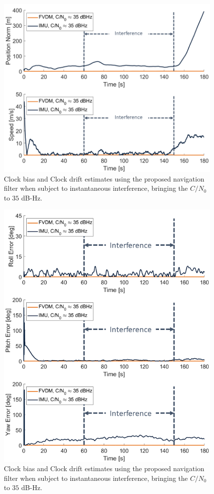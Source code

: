 \documentclass[12pt]{report}
\begin{document}
\begin{figure}[!ht]
  \centering
  \includegraphics[width=0.75\linewidth]{Figures/Results/trajectoryfigure/Slide18.PNG}
  \caption{Clock bias and Clock drift estimates using the proposed navigation filter when subject to instantaneous interference, bringing the \(C/N_0\) to \(35\) dB-Hz.}\label{fig:PosVel35}
\end{figure}


\begin{figure}[!ht]
  \centering
  \includegraphics[width=0.75\linewidth]{Figures/Results/trajectoryfigure/Slide6.PNG}
  \caption{Clock bias and Clock drift estimates using the proposed navigation filter when subject to instantaneous interference, bringing the \(C/N_0\) to \(35\) dB-Hz.}\label{fig:Eul35}
\end{figure}
\end{document}
